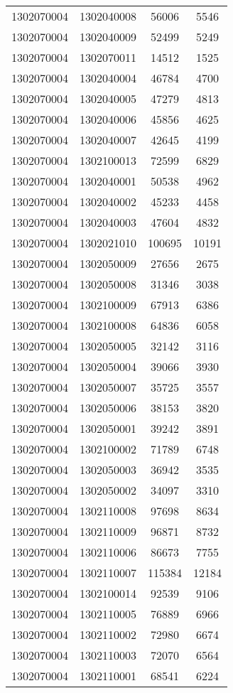 \begin{longtable}{llcc}
1302070004 & 1302040008 & 56006 & 5546\\
1302070004 & 1302040009 & 52499 & 5249\\
1302070004 & 1302070011 & 14512 & 1525\\
1302070004 & 1302040004 & 46784 & 4700\\
1302070004 & 1302040005 & 47279 & 4813\\
1302070004 & 1302040006 & 45856 & 4625\\
1302070004 & 1302040007 & 42645 & 4199\\
1302070004 & 1302100013 & 72599 & 6829\\
1302070004 & 1302040001 & 50538 & 4962\\
1302070004 & 1302040002 & 45233 & 4458\\
1302070004 & 1302040003 & 47604 & 4832\\
1302070004 & 1302021010 & 100695 & 10191\\
1302070004 & 1302050009 & 27656 & 2675\\
1302070004 & 1302050008 & 31346 & 3038\\
1302070004 & 1302100009 & 67913 & 6386\\
1302070004 & 1302100008 & 64836 & 6058\\
1302070004 & 1302050005 & 32142 & 3116\\
1302070004 & 1302050004 & 39066 & 3930\\
1302070004 & 1302050007 & 35725 & 3557\\
1302070004 & 1302050006 & 38153 & 3820\\
1302070004 & 1302050001 & 39242 & 3891\\
1302070004 & 1302100002 & 71789 & 6748\\
1302070004 & 1302050003 & 36942 & 3535\\
1302070004 & 1302050002 & 34097 & 3310\\
1302070004 & 1302110008 & 97698 & 8634\\
1302070004 & 1302110009 & 96871 & 8732\\
1302070004 & 1302110006 & 86673 & 7755\\
1302070004 & 1302110007 & 115384 & 12184\\
1302070004 & 1302100014 & 92539 & 9106\\
1302070004 & 1302110005 & 76889 & 6966\\
1302070004 & 1302110002 & 72980 & 6674\\
1302070004 & 1302110003 & 72070 & 6564\\
1302070004 & 1302110001 & 68541 & 6224\\

\end{longtable}
